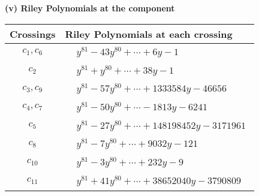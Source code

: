 \documentclass[1p]{elsarticle_modified}
\theoremstyle{definition}
\begin{document}
\newpage\renewcommand{\arraystretch}{1}
\flushleft \textbf{(v) Riley Polynomials at the component}\newline \\
\begin{tabular}{m{50pt}|m{274pt}}
Crossings & \hspace{64pt}Riley Polynomials at each crossing \\
\hline $$\begin{aligned}c_{1},c_{6}\end{aligned}$$&$\begin{aligned}
&y^{81}-43 y^{80}+\cdots+6 y-1
\end{aligned}$\\
\hline $$\begin{aligned}c_{2}\end{aligned}$$&$\begin{aligned}
&y^{81}+y^{80}+\cdots+38 y-1
\end{aligned}$\\
\hline $$\begin{aligned}c_{3},c_{9}\end{aligned}$$&$\begin{aligned}
&y^{81}-57 y^{80}+\cdots+1333584 y-46656
\end{aligned}$\\
\hline $$\begin{aligned}c_{4},c_{7}\end{aligned}$$&$\begin{aligned}
&y^{81}-50 y^{80}+\cdots-1813 y-6241
\end{aligned}$\\
\hline $$\begin{aligned}c_{5}\end{aligned}$$&$\begin{aligned}
&y^{81}-27 y^{80}+\cdots+148198452 y-3171961
\end{aligned}$\\
\hline $$\begin{aligned}c_{8}\end{aligned}$$&$\begin{aligned}
&y^{81}-7 y^{80}+\cdots+9032 y-121
\end{aligned}$\\
\hline $$\begin{aligned}c_{10}\end{aligned}$$&$\begin{aligned}
&y^{81}-3 y^{80}+\cdots+232 y-9
\end{aligned}$\\
\hline $$\begin{aligned}c_{11}\end{aligned}$$&$\begin{aligned}
&y^{81}+41 y^{80}+\cdots+38652040 y-3790809
\end{aligned}$\\
\hline
\end{tabular}\\~\\
\end{document}
